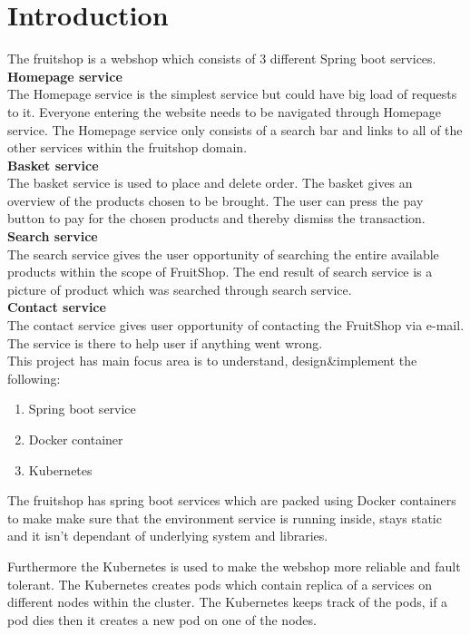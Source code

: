 \chapter{Introduction}\label{ch:introduction}

The fruitshop is a webshop which consists of 3 different Spring boot services.\\ 


\textbf{Homepage service}\\
The Homepage service is the simplest service but could have big load of requests to it. Everyone entering the website needs to be navigated through Homepage service. 
The Homepage service only consists of a search bar and links to all of the other services within the fruitshop domain.\\ 

\textbf{Basket service }\\
The basket service is used to place and delete order. The basket gives an overview of the products chosen to be brought. The user can press the pay button to pay for the chosen products and thereby dismiss the transaction.\\ 

\textbf{Search service }\\
The search service gives the user opportunity of searching the entire available products within the scope of FruitShop. The end result of search service is a picture of product which was searched through search service.\\   

\textbf{Contact service}\\
The contact service gives user opportunity of contacting the FruitShop via e-mail. The service is there to help user if anything went wrong.\\


This project has main focus area is to understand, design&implement the following:  

\begin{enumerate}
	\item Spring boot service
	\item Docker container
	\item Kubernetes
\end{enumerate}

The fruitshop has spring boot services which are packed using Docker containers to make make sure that the environment service is running inside, stays static and it isn't dependant of underlying system and libraries. 

Furthermore the Kubernetes is used to make the webshop more reliable and fault tolerant. The Kubernetes creates pods which contain replica of a services on different nodes within the cluster. The Kubernetes keeps track of the pods, if a pod dies then it creates a new pod on one of the nodes. 





